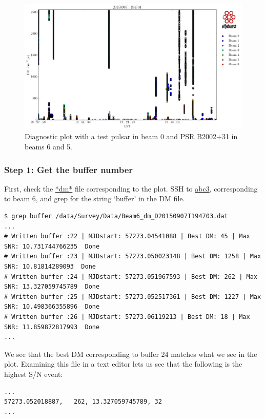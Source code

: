\documentclass{article}
\begin{document}
\begin{figure}[h]
\includegraphics[width=\textwidth]{AllBeams_D20150907T194704.png}
\caption{Diagnostic plot with a test pulsar in beam 0 and PSR B2002+31 in beams
    6 and 5.\label{fig_dmvst}}
\end{figure}

\subsubsection{Step 1: Get the buffer number}

First, check the \url{*dm*} file corresponding to the plot. SSH to \url{abc3},
corresponding to beam 6, and grep for the string `buffer' in the DM file.

\small{
\begin{verbatim}
$ grep buffer /data/Survey/Data/Beam6_dm_D20150907T194703.dat
...
# Written buffer :22 | MJDstart: 57273.04541088 | Best DM: 45 | Max SNR: 10.731744766235  Done
# Written buffer :23 | MJDstart: 57273.050023148 | Best DM: 1258 | Max SNR: 10.81814289093  Done
# Written buffer :24 | MJDstart: 57273.051967593 | Best DM: 262 | Max SNR: 13.327059745789  Done
# Written buffer :25 | MJDstart: 57273.052517361 | Best DM: 1227 | Max SNR: 10.498366355896  Done
# Written buffer :26 | MJDstart: 57273.06119213 | Best DM: 18 | Max SNR: 11.859872817993  Done
...
\end{verbatim}
}

We see that the best DM corresponding to buffer 24 matches what we see in the
plot. Examining this file in a text editor lets us see that the following is
the highest S/N event:

\small{
\begin{verbatim}
...
57273.052018887,   262, 13.327059745789, 32
...
\end{verbatim}
}
\end{document}
